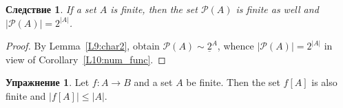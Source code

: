 \documentclass[12pt,notitlepage]{article}
\theoremstyle{plain}
\newtheorem{lemma}[thm]{Лемма}
\newtheorem{corr}[thm]{Следствие}
\theoremstyle{definition}
\newtheorem{exc}[thm]{Упражнение}
\newtheorem{exm}[thm]{Пример}
\theoremstyle{plain}
\newcommand{\N}{\mathbb{N}}
\renewcommand{\setminus}{\smallsetminus}
\newcommand{\void}{\varnothing}
\newcommand{\mP}{\mathcal{P}}
\newcommand{\rst}{\mathop{\upharpoonright}}
\newcommand{\ul}[1]{\underline{#1}}
\newcommand{\1}{\mathbf{1}}
\newcommand{\0}{\mathbf{0}}
\begin{document}
\begin{corr}\label{L10:num_pow}
	If a set $A$ is finite, then the set $\mP(A)$ is finite as well and $|\mP(A)| = 2^{|A|}$.
\end{corr}
\begin{proof}
	By Lemma~\ref{L9:char2}, obtain $\mP(A) \sim \ul{2}^A$, whence $|\mP(A)| = 2^{|A|}$ in view of Corollary~\ref{L10:num_func}.
\end{proof}
%
%
%


\begin{exc}\label{L10:fin_img}
	Let $f\colon A \to B$ and a set $A$ be finite. Then the set $f[A]$ is also finite and $|f[A]| \leq |A|$.
\end{exc}
\end{document}
